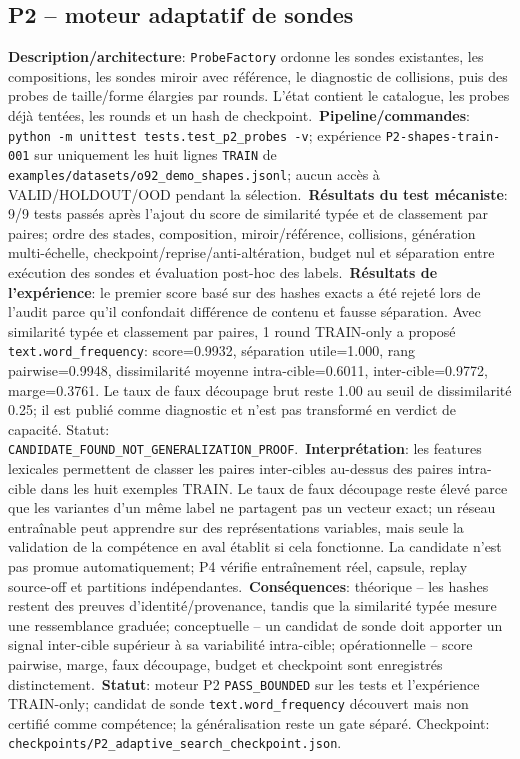 \documentclass[11pt,a4paper,oneside]{report}
\begin{document}
\subsection{P2 -- moteur adaptatif de sondes}
\textbf{Description/architecture}: \texttt{ProbeFactory} ordonne les sondes existantes, les compositions, les sondes miroir avec référence, le diagnostic de collisions, puis des probes de taille/forme élargies par rounds. L'état contient le catalogue, les probes déjà tentées, les rounds et un hash de checkpoint.\
\textbf{Pipeline/commandes}: \texttt{python -m unittest tests.test\_p2\_probes -v}; expérience \texttt{P2-shapes-train-001} sur uniquement les huit lignes \texttt{TRAIN} de \texttt{examples/datasets/o92\_demo\_shapes.jsonl}; aucun accès à VALID/HOLDOUT/OOD pendant la sélection.\
\textbf{Résultats du test mécaniste}: 9/9 tests passés après l’ajout du score de similarité typée et de classement par paires; ordre des stades, composition, miroir/référence, collisions, génération multi-échelle, checkpoint/reprise/anti-altération, budget nul et séparation entre exécution des sondes et évaluation post-hoc des labels.\
\textbf{Résultats de l’expérience}: le premier score basé sur des hashes exacts a été rejeté lors de l’audit parce qu’il confondait différence de contenu et fausse séparation. Avec similarité typée et classement par paires, 1 round TRAIN-only a proposé \texttt{text.word\_frequency}: score=0.9932, séparation utile=1.000, rang pairwise=0.9948, dissimilarité moyenne intra-cible=0.6011, inter-cible=0.9772, marge=0.3761. Le taux de faux découpage brut reste 1.00 au seuil de dissimilarité 0.25; il est publié comme diagnostic et n’est pas transformé en verdict de capacité. Statut: \texttt{CANDIDATE\_FOUND\_NOT\_GENERALIZATION\_PROOF}.\
\textbf{Interprétation}: les features lexicales permettent de classer les paires inter-cibles au-dessus des paires intra-cible dans les huit exemples TRAIN. Le taux de faux découpage reste élevé parce que les variantes d’un même label ne partagent pas un vecteur exact; un réseau entraînable peut apprendre sur des représentations variables, mais seule la validation de la compétence en aval établit si cela fonctionne. La candidate n’est pas promue automatiquement; P4 vérifie entraînement réel, capsule, replay source-off et partitions indépendantes.\
\textbf{Conséquences}: théorique -- les hashes restent des preuves d’identité/provenance, tandis que la similarité typée mesure une ressemblance graduée; conceptuelle -- un candidat de sonde doit apporter un signal inter-cible supérieur à sa variabilité intra-cible; opérationnelle -- score pairwise, marge, faux découpage, budget et checkpoint sont enregistrés distinctement.\
\textbf{Statut}: moteur P2 \texttt{PASS\_BOUNDED} sur les tests et l’expérience TRAIN-only; candidat de sonde \texttt{text.word\_frequency} découvert mais non certifié comme compétence; la généralisation reste un gate séparé. Checkpoint: \texttt{checkpoints/P2\_adaptive\_search\_checkpoint.json}.\
\end{document}
